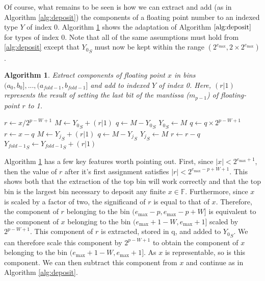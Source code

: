 \documentclass[12pt]{article}
\providecommand{\F}{\ensuremath{\mathbb{F}}}
\providecommand{\max}{\ensuremath{\text{max}}}
\theoremstyle{plain}
\newtheorem{alg}{Algorithm}[section]
\begin{document}
      Of course, what remains to be seen is how we can extract and add (as in Algorithm \ref{alg:deposit}) the components of a floating point number to an indexed type $Y$ of index 0. Algorithm \ref{alg:deposit0} shows the adaptation of Algorithm $\ref{alg:deposit}$ for types of index 0. Note that all of the same assumptions must hold from \ref{alg:deposit} except that ${Y_0}_S$ must now be kept within the range $(2^{e_{\max}}, 2 \times 2^{e_{\max}})$.
      \begin{alg}
        Extract components of floating point $x$ in bins $(a_0, b_0], ..., (a_{fold - 1}, b_{fold - 1}]$ and add to indexed $Y$ of index 0. Here, $(r | 1)$ represents the result of setting the last bit of the mantissa ($m_{p - 1}$) of floating-point $r$ to 1.
        \begin{algorithmic}
            \State $r \gets x / 2^{p - W + 1}$
            \State $M \gets {Y_0}_S + (r | 1)$
            \State $q \gets M - {Y_0}_S$
            \State ${Y_0}_S \gets M$
            \State $q \gets q \times 2^{p - W + 1}$
            \State $r \gets x - q$
              \State $M \gets {Y_j}_S + (r | 1)$
              \State $q \gets M - {Y_j}_S$
              \State ${Y_j}_S \gets M$
              \State $r \gets r - q$
            \EndFor
            \State ${Y_{fold - 1}}_S \gets {Y_{fold - 1}}_S + (r | 1)$
          \EndFunction
        \end{algorithmic}
        \label{alg:deposit0}
      \end{alg}

      Algorithm \ref{alg:deposit0} has a few key features worth pointing out. First, since $|x| < 2^{e_{\max} + 1}$, then the value of $r$ after it's first assignment satisfies $|r| < 2^{e_{\max} - p + W + 1}$. This shows both that the extraction of the top bin will work correctly and that the top bin is the largest bin necessary to deposit any finite $x \in \F$.
      Furthermore, since $x$ is scaled by a factor of two, the significand of $r$ is equal to that of $x$.
      Therefore, the component of $r$ belonging to the bin $(e_{\max} - p, e_{\max} - p + W]$ is equivalent to the component of $x$ belonging to the bin $(e_{\max} + 1 - W, e_{\max} + 1]$ scaled by $2^{p - W + 1}$. This component of $r$ is extracted, stored in q, and added to ${Y_0}_S$. We can therefore scale this component by $2^{p - W + 1}$ to obtain the component of $x$ belonging to the bin $(e_{\max} + 1 - W, e_{\max} + 1]$. As $x$ is representable, so is this component. We can then subtract this component from $x$ and continue as in Algorithm \ref{alg:deposit}.
\end{document}
